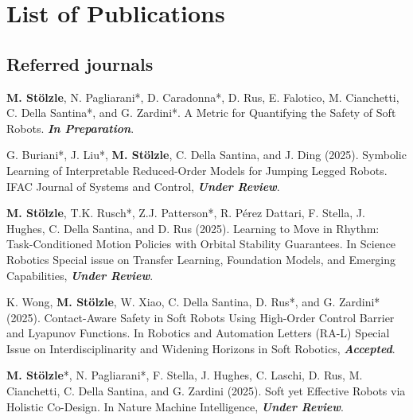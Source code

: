 \chapter*{List of Publications}
\label{publications}

\section*{Referred journals}

\begin{enumerate}{
    \item[\faFileTextO \, \stepcounter{enumi}\arabic{enumi}.] \textbf{M. Stölzle}, N. Pagliarani*, D. Caradonna*, D. Rus, E. Falotico, M. Cianchetti, C. Della Santina*, and G. Zardini*. A Metric for Quantifying the Safety of Soft Robots. \textbf{\emph{In Preparation}}.
    \item[\stepcounter{enumi}\arabic{enumi}.] \citep{buriani2025symbolic} G. Buriani*, J. Liu*,  \textbf{M. Stölzle}, C. Della Santina, and J. Ding (2025). Symbolic Learning of Interpretable Reduced-Order Models for Jumping Legged Robots. IFAC Journal of Systems and Control, \textbf{\emph{Under Review}}.
    \item[\faFileTextO \, \stepcounter{enumi}\arabic{enumi}.] \citep{stolzle2025learning} \textbf{M. Stölzle}, T.K. Rusch*, Z.J. Patterson*, R. Pérez Dattari, F. Stella, J. Hughes, C. Della Santina, and D. Rus (2025). Learning to Move in Rhythm: Task-Conditioned Motion Policies with Orbital Stability Guarantees. In Science Robotics Special issue on Transfer Learning, Foundation Models, and Emerging Capabilities, \textbf{\emph{Under Review}}.
    \item[\stepcounter{enumi}\arabic{enumi}.] \citep{wong2025contact} K. Wong, \textbf{M. Stölzle}, W. Xiao, C. Della Santina, D. Rus*, and G. Zardini* (2025). Contact-Aware Safety in Soft Robots Using High-Order Control Barrier and Lyapunov Functions. In Robotics and Automation Letters (RA-L) Special Issue on Interdisciplinarity and Widening Horizons in Soft Robotics, \textbf{\emph{Accepted}}.
    \item[\faFileTextO \, \stepcounter{enumi}\arabic{enumi}.] \citep{stolzle2025soft} \textbf{M. Stölzle}*, N. Pagliarani*, F. Stella, J. Hughes, C. Laschi, D. Rus, M. Cianchetti, C. Della Santina, and G. Zardini (2025). Soft yet Effective Robots via Holistic Co-Design. In Nature Machine Intelligence, \textbf{\emph{Under Review}}.
}
\end{enumerate}
